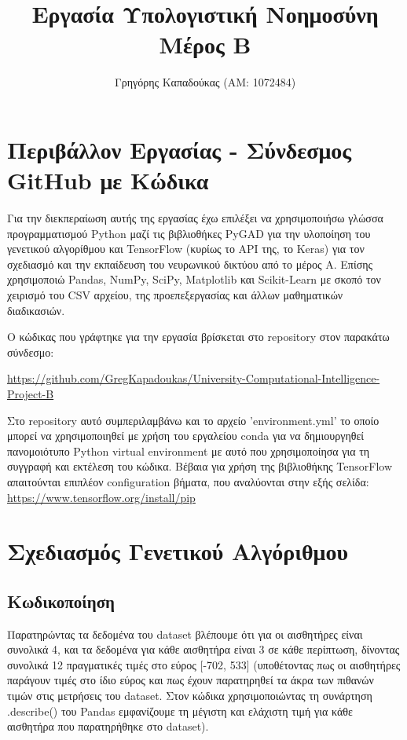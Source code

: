 \documentclass[12pt,a4paper]{article}
\title{Εργασία Υπολογιστική Νοημοσύνη\\Μέρος Β}
\author{Γρηγόρης Καπαδούκας (ΑΜ: 1072484)}
\begin{document}
\maketitle

\setcounter{section}{-1}
\section{Περιβάλλον Εργασίας - Σύνδεσμος GitHub με Κώδικα}
Για την διεκπεραίωση αυτής της εργασίας έχω επιλέξει να χρησιμοποιήσω γλώσσα προγραμματισμού Python μαζί τις βιβλιοθήκες PyGAD για την υλοποίηση του γενετικού αλγορίθμου και TensorFlow (κυρίως το API της, το Keras) για τον σχεδιασμό και την εκπαίδευση του νευρωνικού δικτύου από το μέρος Α. Επίσης χρησιμοποιώ Pandas, NumPy, SciPy, Matplotlib και Scikit-Learn με σκοπό τον χειρισμό του CSV αρχείου, της προεπεξεργασίας και άλλων μαθηματικών διαδικασιών.

Ο κώδικας που γράφτηκε για την εργασία βρίσκεται στο repository στον παρακάτω σύνδεσμο:

\textcolor{blue}{\href{https://github.com/GregKapadoukas/University-Computational-Intelligence-Project-B}{https://github.com/GregKapadoukas/University-Computational-Intelligence-Project-B}}

Στο repository αυτό συμπεριλαμβάνω και το αρχείο 'environment.yml' το οποίο μπορεί να χρησιμοποιηθεί με χρήση του εργαλείου conda για να δημιουργηθεί πανομοιότυπο Python virtual environment με αυτό που χρησιμοποίησα για τη συγγραφή και εκτέλεση του κώδικα. Βέβαια για χρήση της βιβλιοθήκης TensorFlow απαιτούνται επιπλέον configuration βήματα, που αναλύονται στην εξής σελίδα:
\textcolor{blue}{\href{https://www.tensorflow.org/install/pip}{https://www.tensorflow.org/install/pip}}

\section{Σχεδιασμός Γενετικού Αλγόριθμου}

\subsection{Κωδικοποίηση}

Παρατηρώντας τα δεδομένα του dataset βλέπουμε ότι για οι αισθητήρες είναι συνολικά 4, και τα δεδομένα για κάθε αισθητήρα είναι 3 σε κάθε περίπτωση, δίνοντας συνολικά 12 πραγματικές τιμές στο εύρος [-702, 533] (υποθέτοντας πως οι αισθητήρες παράγουν τιμές στο ίδιο εύρος και πως έχουν παρατηρηθεί τα άκρα των πιθανών τιμών στις μετρήσεις του dataset. Στον κώδικα χρησιμοποιώντας τη συνάρτηση .describe() του Pandas εμφανίζουμε τη μέγιστη και ελάχιστη τιμή για κάθε αισθητήρα που παρατηρήθηκε στο dataset).
\end{document}
